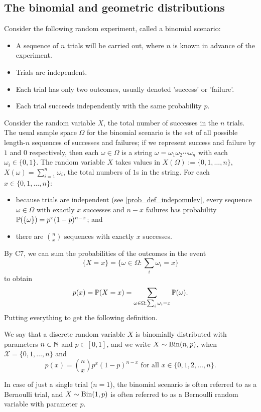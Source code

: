 \documentclass[10pt, a4paper]{article}
\begin{document}
\subsection{The binomial and geometric distributions}
Consider the following random experiment,
called a binomial scenario:
\begin{itemize}
    \item A sequence of $n$ trials will be carried out, where $n$ is known in advance of the experiment.
    \item Trials are independent.
    \item Each trial has only two outcomes, usually denoted 'success' or 'failure'.
    \item Each trial succeeds independently with the same probability $p$.
\end{itemize}
Consider the random variable $X$, the total number of successes in the $n$ trials.
The usual sample space $\Omega$ for the binomial scenario is the set of all possible length-$n$ sequences of successes and failures; if we represent success and failure by $1$ and $0$ respectively, then each $\omega \in \Omega$ is a string 
$\omega = \omega_1 \omega_2 \dotsi \omega_n$ with each $\omega_i \in \{0, 1\}$.
The random variable $X$ takes values in $X(\Omega) := \{0, 1, \dotsc, n\}$,
$X(\omega) = \sum_{i = 1}^{n}\omega_i$, the total numbers of $1$s in the string.
For each $x \in \{0, 1, \dotsc, n\}$:
\begin{itemize}
    \item because trials are independent (see \autoref{prob_def_indepomulev}, every sequence $\omega \in \Omega$ with exactly $x$ successes and $n - x$ failures has probability $\P(\{\omega\}) = p ^ x (1 - p) ^ {n - x}$; and
    \item there are $\binom{n}{x}$ sequences with exactly $x$ successes.
\end{itemize}
By C7, we can sum the probabilities of the outcomes in the event
\[
\{X = x\} = \{\omega \in \Omega : \sum_i \omega_i = x\}
\]
to obtain
\[
p(x) = \P(X = x) = \sum_{\omega \in \Omega: \sum_i \omega_i = x}\P(\omega).
\]
Putting everything to get the following definition.
\begin{definition}
    We say that a discrete random variable $X$ is binomially distributed with parameters $n \in \N$ and $p \in [0, 1]$,
    and we write $X \sim \Bin(n, p)$,
    when $\mathcal{X} = \{0, 1, \dotsc, n\}$ and
    \[
    p(x) = \binom{n}{x}p ^ x (1 - p) ^ {n - x}\text{ for all } x \in \{0, 1, 2, \dotsc, n\}.
    \]
\end{definition}
In case of just a single trial ($n = 1$),
the binomial scenario is often referred to as a Bernoulli trial,
and $X \sim \Bin(1, p)$ is often referred to as a Bernoulli random variable with parameter $p$.
\end{document}

